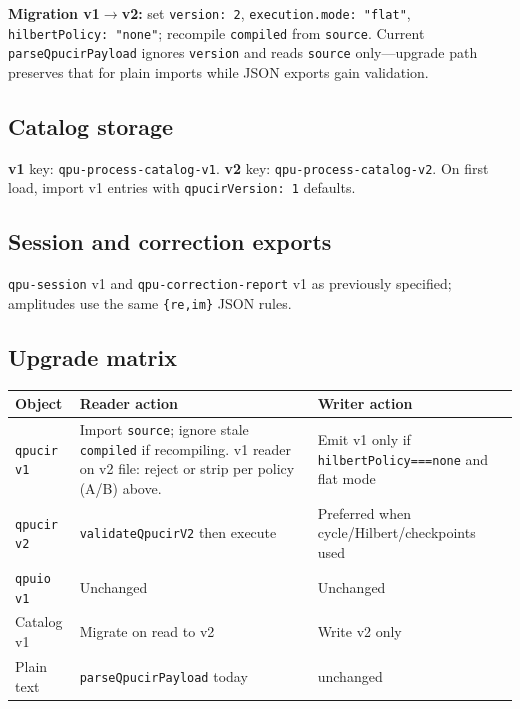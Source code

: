 \documentclass[11pt,a4paper]{article}
\begin{document}
\textbf{Migration v1$\rightarrow$v2:} set \texttt{version: 2}, \texttt{execution.mode: "flat"}, \texttt{hilbertPolicy: "none"}; recompile \texttt{compiled} from \texttt{source}. Current \texttt{parseQpucirPayload} ignores \texttt{version} and reads \texttt{source} only---upgrade path preserves that for plain imports while JSON exports gain validation.

\subsection{Catalog storage}

\textbf{v1} key: \texttt{qpu-process-catalog-v1}. \textbf{v2} key: \texttt{qpu-process-catalog-v2}. On first load, import v1 entries with \texttt{qpucirVersion: 1} defaults.

\subsection{Session and correction exports}

\texttt{qpu-session} v1 and \texttt{qpu-correction-report} v1 as previously specified; amplitudes use the same \texttt{\{re,im\}} JSON rules.

\subsection{Upgrade matrix}

\begin{center}
\begin{tabular}{@{}p{3cm}p{4.5cm}p{4.5cm}}
\toprule
Object & Reader action & Writer action \\
\midrule
\texttt{qpucir v1} & Import \texttt{source}; ignore stale \texttt{compiled} if recompiling. v1 reader on v2 file: reject or strip per policy (A/B) above. & Emit v1 only if \texttt{hilbertPolicy===none} and flat mode \\
\texttt{qpucir v2} & \texttt{validateQpucirV2} then execute & Preferred when cycle/Hilbert/checkpoints used \\
\texttt{qpuio v1} & Unchanged & Unchanged \\
Catalog v1 & Migrate on read to v2 & Write v2 only \\
Plain text & \texttt{parseQpucirPayload} today & unchanged \\
\bottomrule
\end{tabular}
\end{center}

\end{document}
